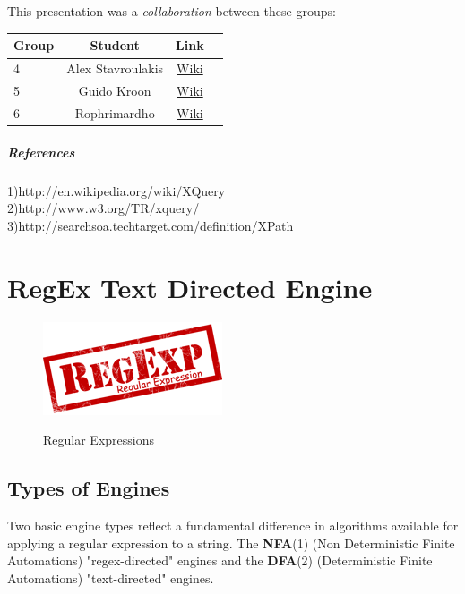 \documentclass[a4paper,11pt]{report}
\begin{document}
\paragraph{}
This presentation was a \emph{collaboration} between these groups: \\
 
\begin{center}
 \begin{tabular}{| l | c | c | c |}
 \hline \textbf{Group} & \textbf{Student} & \textbf{Link} \\
 \hline 
 4 & Alex Stavroulakis & \href{https://www.os3.nl/2014-2015/students/alexandros_stavroulakis/es}{Wiki}\\
 \hline 
 5 & Guido Kroon & \href{https://www.os3.nl/2014-2015/students/guido_kroon/es/assignments1}{Wiki} \\ 
 \hline 
 6 & Rophrimardho & \href{https://www.os3.nl/2014-2015/students/rohprimardho/es/homework_1.3}{Wiki} \\ 
 \hline 
 \end{tabular} 
\end{center}
 
\paragraph{References\\}
1)http://en.wikipedia.org/wiki/XQuery \\
2)http://www.w3.org/TR/xquery/ \\
3)http://searchsoa.techtarget.com/definition/XPath \\


\chapter{RegEx Text Directed Engine}

\begin{figure}[h]
	\centering
		\includegraphics{images/regexp_logo.png}~\\[1cm]
		\caption{Regular Expressions}
\end{figure}

\section{Types of Engines}
\begin{flushleft}
Two basic engine types reflect a fundamental difference in algorithms available for applying a regular expression to a string. The \textbf{NFA}{\footnotesize (1)} (Non Deterministic Finite Automations) "regex-directed" engines and the \textbf{DFA}{\footnotesize (2)} (Deterministic Finite Automations) "text-directed" engines.
\end{flushleft}
\end{document}

